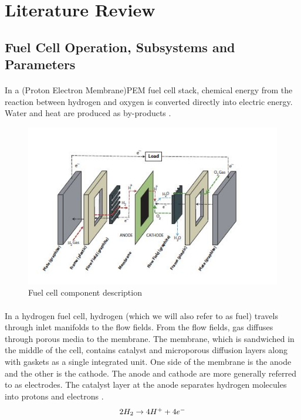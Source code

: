 \section{Literature Review}
\subsection{Fuel Cell Operation, Subsystems and Parameters}
\paragraph{}In a (Proton Electron Membrane)PEM fuel cell stack, chemical energy from the reaction between hydrogen and oxygen is converted directly into electric energy. Water and heat are produced as by-products \cite{thanapalan_model_2011}.
\begin{figure}[!h]
\includegraphics{Figures/Figure5}
\caption{Fuel cell component description
\cite{stefanopoulou_mechatronics_nodate}}
\end{figure} 
\paragraph{}In a hydrogen fuel cell, hydrogen (which we will also refer to as fuel) travels through inlet manifolds to the flow fields. From the flow fields, gas diffuses through porous media to the membrane. The membrane, which is sandwiched in the middle of the cell, contains catalyst and microporous diffusion layers along with gaskets as a single integrated unit. One side of the membrane is  the anode and the other is the cathode. The anode and cathode are more generally referred to as electrodes. The catalyst layer at the anode separates hydrogen molecules into protons and electrons \cite{stefanopoulou_mechatronics_nodate}.
\begin{equation}
$$2H_{2} \rightarrow 4H^{+}+4e^{-}$$
\end{equation}
